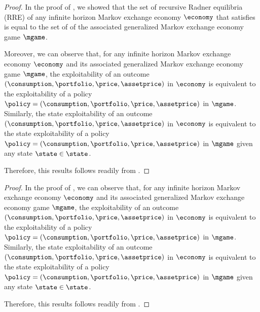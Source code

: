 \lemmaexploitRRE*
\begin{proof}
    In the proof of , we showed that the set of recursive Radner equilibria (RRE) of any infinite horizon Markov exchange economy $\economy$ that satisfies  is equal to the set of \MPGNE{} of the associated generalized Markov exchange economy game $\mgame$. 
    
    Moreover, we can observe that, for any infinite horizon Markov exchange economy $\economy$ and its associated generalized Markov exchange economy game $\mgame$, 
    the exploitability of an outcome $(\consumption, \portfolio, \price, \assetprice)$ in $\economy$ is equivalent to the exploitability of a policy $\policy=(\consumption, \portfolio, \price, \assetprice)$ in $\mgame$. 
    Similarly,
    the state exploitability of an outcome $(\consumption, 
    \portfolio, \price, \assetprice)$ in $\economy$ is equivalent to the state exploitability of a policy $\policy=(\consumption, \portfolio, \price, \assetprice)$ in $\mgame$ given any state $\state\in \state$. 

    Therefore, this results follows readily from .
\end{proof}
\fi
\thmcomputeSRE*
\begin{proof}
     In the proof of , we can observe that, for any infinite horizon Markov exchange economy $\economy$ and its associated generalized Markov exchange economy game $\mgame$, 
    the exploitability of an outcome $(\consumption, \portfolio, \price, \assetprice)$ in $\economy$ is equivalent to the exploitability of a policy $\policy=(\consumption, \portfolio, \price, \assetprice)$ in $\mgame$. 
    Similarly,
    the state exploitability of an outcome $(\consumption, 
    \portfolio, \price, \assetprice)$ in $\economy$ is equivalent to the state exploitability of a policy $\policy=(\consumption, \portfolio, \price, \assetprice)$ in $\mgame$ given any state $\state\in \state$. 

    Therefore, this results follows readily from .
\end{proof}